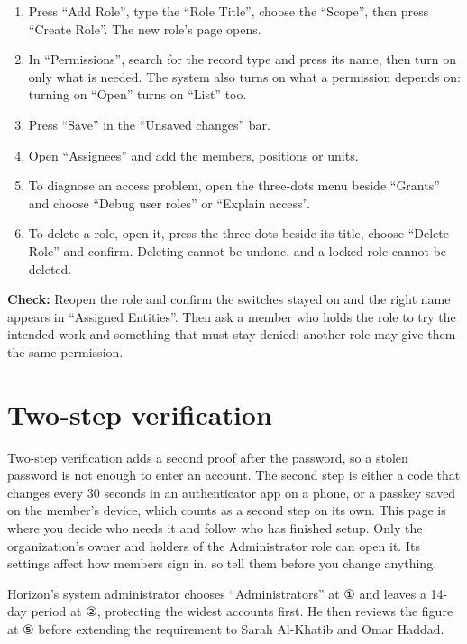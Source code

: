 \begin{enumerate}
\item Press “Add Role”, type the “Role Title”, choose the “Scope”, then press “Create Role”. The new role’s page opens.
\item In “Permissions”, search for the record type and press its name, then turn on only what is needed. The system also turns on what a permission depends on: turning on “Open” turns on “List” too.
\item Press “Save” in the “Unsaved changes” bar.
\item Open “Assignees” and add the members, positions or units.
\item To diagnose an access problem, open the three-dots menu beside “Grants” and choose “Debug user roles” or “Explain access”.
\item To delete a role, open it, press the three dots beside its title, choose “Delete Role” and confirm. Deleting cannot be undone, and a locked role cannot be deleted.
\end{enumerate}

\textbf{Check:} Reopen the role and confirm the switches stayed on and the right name appears in “Assigned Entities”. Then ask a member who holds the role to try the intended work and something that must stay denied; another role may give them the same permission.

\clearpage
\section{Two-step verification}
\label{sec:settings-feature-two-step}

Two-step verification adds a second proof after the password, so a stolen password is not enough to enter an account. The second step is either a code that changes every 30 seconds in an authenticator app on a phone, or a passkey saved on the member’s device, which counts as a second step on its own. This page is where you decide who needs it and follow who has finished setup. Only the organization’s owner and holders of the Administrator role can open it. Its settings affect how members sign in, so tell them before you change anything.

\begin{rcnote}
Horizon’s system administrator chooses “Administrators” at ① and leaves a 14-day period at ②, protecting the widest accounts first. He then reviews the figure at ⑤ before extending the requirement to Sarah Al-Khatib and Omar Haddad.
\end{rcnote}

